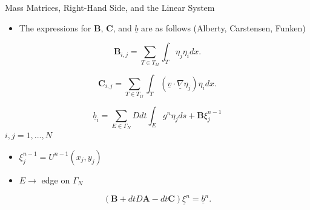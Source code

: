 \documentclass[10pt]{beamer}
\begin{document}
\begin{frame}{ Mass Matrices, Right-Hand Side, and the Linear System} \label{MassmatRHSLinearSystem}
\begin{itemize}
\item The expressions for $\mathbf{B}$, $\mathbf{C}$, and $\underline{b}$ are as follows (Alberty, Carstensen, Funken)
\end{itemize}

\begin{equation}
\mathbf{B}_{i,j} = \sum_{T \in T_{\Omega}} \int_{T} \eta_{j}\eta_{i} dx.
\end{equation}

\begin{equation}
\mathbf{C}_{i,j} = \sum_{T \in T_{\Omega}}\int_{T}\left(\underline{v}\cdot \underline{\nabla}\eta_{j}\right)\eta_{i} dx.
\end{equation}

\begin{equation}
\underline{b}_{i}= \sum_{E \in \Gamma_{N}} Ddt\int_{E}g^{n}\eta_{j}ds+\mathbf{B}\xi_{j}^{n-1}
\end{equation}
 $i,j=1,...,N$
\begin{itemize}
\item $\xi_{j}^{n-1} = U^{n-1}\left(x_{j},y_{j}\right)$
\item $E \rightarrow$ edge on $\Gamma_{N}$
\end{itemize}
\begin{equation}
\left(\mathbf{B}+dtD\mathbf{A}-dt\mathbf{C}\right)\underline{\xi}^{n}=\underline{b}^{n}.
\end{equation}
\hyperlink{Questions}{}
\end{frame}
\end{document}
